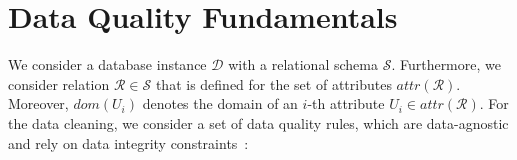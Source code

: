 \section{Data Quality Fundamentals}
\label{sec:expl}



We consider a database instance $\mathcal{D}$ with a relational schema $\mathcal{S}$. Furthermore, we consider relation $\mathcal{R} \in \mathcal{S}$ that is defined for the set of attributes $attr(\mathcal{R})$. Moreover, $dom(U_i)$ denotes the domain of an $i$-th attribute $U_i \in attr(\mathcal{R})$. For the data cleaning, we consider a set of data quality rules, which are data-agnostic and rely on data integrity constraints~\cite{AbiteboulHV95}:

